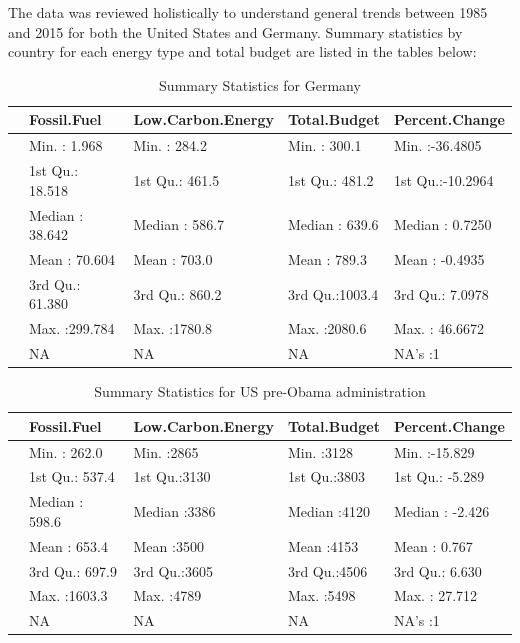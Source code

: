 \documentclass[
  12pt,
]{article}
\begin{document}
The data was reviewed holistically to understand general trends between
1985 and 2015 for both the United States and Germany. Summary statistics
by country for each energy type and total budget are listed in the
tables below:

\begin{table}

\caption{\label{tab:calculating the summary statistics for US and Germany and creating tables}Summary Statistics for Germany}
\centering
\begin{tabular}[t]{l|l|l|l|l}
\hline
  &  Fossil.Fuel & Low.Carbon.Energy &  Total.Budget & Percent.Change\\
\hline
 & Min.   :  1.968 & Min.   : 284.2 & Min.   : 300.1 & Min.   :-36.4805\\
\hline
 & 1st Qu.: 18.518 & 1st Qu.: 461.5 & 1st Qu.: 481.2 & 1st Qu.:-10.2964\\
\hline
 & Median : 38.642 & Median : 586.7 & Median : 639.6 & Median :  0.7250\\
\hline
 & Mean   : 70.604 & Mean   : 703.0 & Mean   : 789.3 & Mean   : -0.4935\\
\hline
 & 3rd Qu.: 61.380 & 3rd Qu.: 860.2 & 3rd Qu.:1003.4 & 3rd Qu.:  7.0978\\
\hline
 & Max.   :299.784 & Max.   :1780.8 & Max.   :2080.6 & Max.   : 46.6672\\
\hline
 & NA & NA & NA & NA's   :1\\
\hline
\end{tabular}
\end{table}

\begin{table}

\caption{\label{tab:calculating the summary statistics for US and Germany and creating tables}Summary Statistics for US pre-Obama administration}
\centering
\begin{tabular}[t]{l|l|l|l|l}
\hline
  &  Fossil.Fuel & Low.Carbon.Energy &  Total.Budget & Percent.Change\\
\hline
 & Min.   : 262.0 & Min.   :2865 & Min.   :3128 & Min.   :-15.829\\
\hline
 & 1st Qu.: 537.4 & 1st Qu.:3130 & 1st Qu.:3803 & 1st Qu.: -5.289\\
\hline
 & Median : 598.6 & Median :3386 & Median :4120 & Median : -2.426\\
\hline
 & Mean   : 653.4 & Mean   :3500 & Mean   :4153 & Mean   :  0.767\\
\hline
 & 3rd Qu.: 697.9 & 3rd Qu.:3605 & 3rd Qu.:4506 & 3rd Qu.:  6.630\\
\hline
 & Max.   :1603.3 & Max.   :4789 & Max.   :5498 & Max.   : 27.712\\
\hline
 & NA & NA & NA & NA's   :1\\
\hline
\end{tabular}
\end{table}
\end{document}
